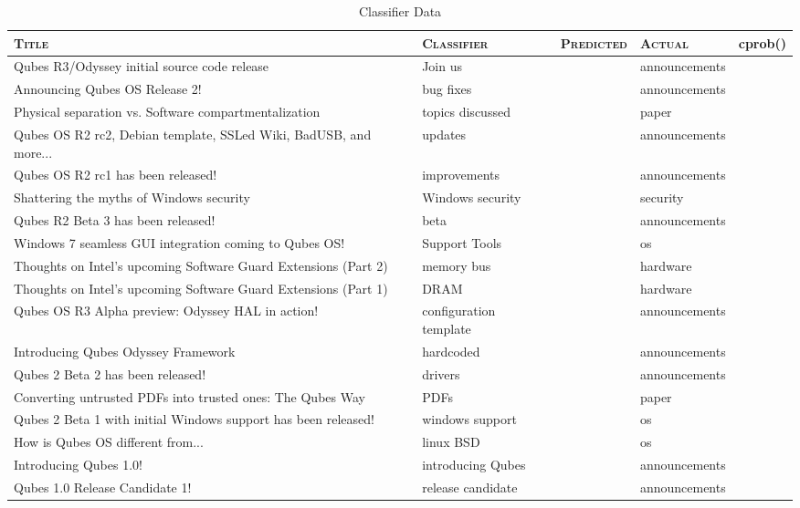  \begin{small}
 \begin{longtable}{|p{5cm}|l|l|l|r|}
 \caption{Classifier Data} \label{tab:data} \\ \hline
\textbf{\textsc{Title}}&\textbf{\textsc{Classifier}}&\textbf{\textsc{Predicted}}&\textbf{\textsc{Actual}}&\textbf{cprob()}\\ \hline\hline
\endhead
Qubes R3/Odyssey initial source code release&Join us&  &announcements&  \\ \hline 
Announcing Qubes OS Release 2!&bug fixes&  &announcements&  \\ \hline 
Physical separation vs. Software compartmentalization&topics discussed&  &paper&  \\ \hline 
Qubes OS R2 rc2, Debian template, SSLed Wiki, BadUSB, and more...&updates&  &announcements&  \\ \hline 
Qubes OS R2 rc1 has been released!&improvements&  &announcements&  \\ \hline 
Shattering the myths of Windows security&Windows security&  &security&  \\ \hline 
Qubes R2 Beta 3 has been released!&beta&  &announcements&  \\ \hline 
Windows 7 seamless GUI integration coming to Qubes OS!&Support Tools&  &os&  \\ \hline 
Thoughts on Intel's upcoming Software Guard Extensions (Part 2)&memory bus&  &hardware&  \\ \hline 
Thoughts on Intel's upcoming Software Guard Extensions (Part 1)&DRAM&  &hardware&  \\ \hline 
Qubes OS R3 Alpha preview: Odyssey HAL in action!&configuration template&  &announcements&  \\ \hline 
Introducing Qubes Odyssey Framework&hardcoded&  &announcements&  \\ \hline 
Qubes 2 Beta 2 has been released!&drivers&  &announcements&  \\ \hline 
Converting untrusted PDFs into trusted ones: The Qubes Way&PDFs&  &paper&  \\ \hline 
Qubes 2 Beta 1 with initial Windows support has been released!&windows support&  &os&  \\ \hline 
How is Qubes OS different from...&linux BSD&  &os&  \\ \hline 
Introducing Qubes 1.0!&introducing Qubes&  &announcements&  \\ \hline 
Qubes 1.0 Release Candidate 1!&release candidate&  &announcements&  \\ \hline 

\end{longtable}
\end{small}
